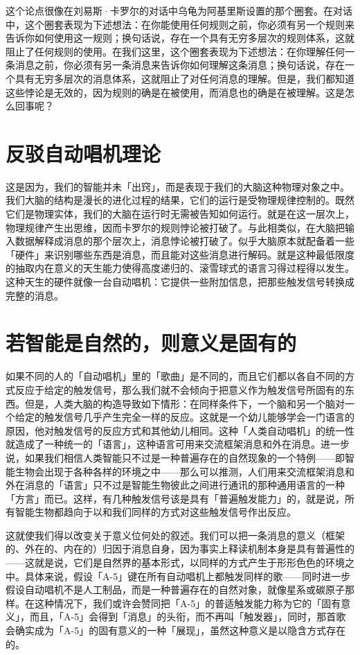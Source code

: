 \documentclass[
  12pt,
  twoside,
  openright,
  oldfontcommands,
]{memoir}
\begin{document}
这个论点很像在刘易斯·卡罗尔的对话中乌龟为阿基里斯设置的那个圈套。在对话中，这个圈套表现为下述想法：在你能使用任何规则之前，你必须有另一个规则来告诉你如何使用这一规则；换句话说，存在一个具有无穷多层次的规则体系，这就阻止了任何规则的使用。在我们这里，这个圈套表现为下述想法：在你理解任何一条消息之前，你必须有另一条消息来告诉你如何理解这条消息；换句话说，存在一个具有无穷多层次的消息体系，这就阻止了对任何消息的理解。但是，我们都知道这些悖论是无效的，因为规则的确是在被使用，而消息也的确是在被理解。这是怎么回事呢？

\section{反驳自动唱机理论}

这是因为，我们的智能并未「出窍」，而是表现于我们的大脑这种物理对象之中。我们大脑的结构是漫长的进化过程的结果，它们的运行是受物理规律控制的。既然它们是物理实体，我们的大脑在运行时无需被告知如何运行。就是在这一层次上，物理规律产生出思维，因而卡罗尔的规则悖论被打破了。与此相类似，在大脑把输入数据解释成消息的那个层次上，消息悖论被打破了。似乎大脑原本就配备着一些「硬件」来识别哪些东西是消息，而且能对这些消息进行解码。就是这种最低限度的抽取内在意义的天生能力使得高度递归的、滚雪球式的语言习得过程得以发生。这种天生的硬件就像一台自动唱机：它提供一些附加信息，把那些触发信号转换成完整的消息。

\section{若智能是自然的，则意义是固有的}

如果不同的人的「自动唱机」里的「歌曲」是不同的，而且它们都以各自不同的方式反应于给定的触发信号，那么我们就不会倾向于把意义作为触发信号所固有的东西。但是，人类大脑的构造导致如下情形：在同样条件下，一个脑和另一个脑对一个给定的触发信号几乎产生完全一样的反应。这就是一个幼儿能够学会一门语言的原因，他对触发信号的反应方式和其他幼儿相同。这种「人类自动唱机」的统一性就造成了一种统一的「语言」，这种语言可用来交流框架消息和外在消息。进一步说，如果我们相信人类智能只不过是一种普遍存在的自然现象的一个特例------即智能生物会出现于各种各样的环境之中------那么可以推测，人们用来交流框架消息和外在消息的「语言」只不过是智能生物彼此之间进行通讯的那种通用语言的一种「方言」而已。这样，有几种触发信号该是具有「普遍触发能力」的，就是说，所有智能生物都趋向于以和我们同样的方式对这些触发信号作出反应。

这就使我们得以改变关于意义位何处的叙述。我们可以把一条消息的意义（框架的、外在的、内在的）归因于消息自身，因为事实上释读机制本身是具有普遍性的------这就是说，它们是自然界的基本形式，以同样的方式产生于形形色色的环境之中。具体来说，假设「A-5」键在所有自动唱机上都触发同样的歌------同时进一步假设自动唱机不是人工制品，而是一种普遍存在的自然对象，就像星系或碳原子那样。在这种情况下，我们或许会赞同把「A-5」的普适触发能力称为它的「固有意义」，而且，「A-5」会得到「消息」的头衔，而不再叫「触发器」，同时，那首歌会确实成为「A-5」的固有意义的一种「展现」，虽然这种意义是以隐含方式存在的。
\end{document}
